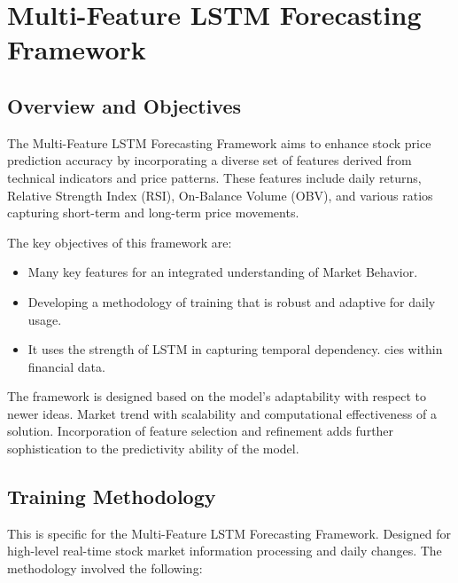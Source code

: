 



\section{Multi-Feature LSTM Forecasting Framework}
\subsection{Overview and Objectives}
The Multi-Feature LSTM Forecasting Framework aims to enhance stock price prediction accuracy by incorporating a diverse set of features derived from technical indicators and price patterns. These features include daily returns, Relative Strength Index (RSI), On-Balance Volume (OBV), and various ratios capturing short-term and long-term price movements. 

The key objectives of this framework are:
\begin{itemize}
    \item Many key features for an integrated understanding of
Market Behavior.
    \item Developing a methodology of training that is robust and adaptive for daily usage.
    \item It uses the strength of LSTM in capturing temporal dependency.
cies within financial data.
\end{itemize}

The framework is designed based on the model's adaptability with respect to newer ideas. Market trend with scalability and computational effectiveness of a solution.
Incorporation of feature selection and refinement adds further sophistication to the predictivity ability of the model.

\subsection{Training Methodology}
This is specific for the Multi-Feature LSTM Forecasting Framework. Designed for high-level real-time stock market information processing and daily changes. The methodology involved the following:
